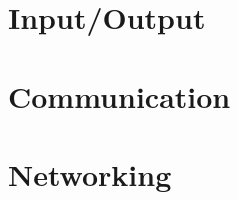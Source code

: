 \documentclass[a4paper]{exam}
\title{\papertitle}
\date{May 2018}
\begin{document}
\maketitle
\tableofcontents

\pagebreak
        

\pagebreak
        

\pagebreak
        

\pagebreak
        

\pagebreak


\pagebreak


\pagebreak


\pagebreak
\section{Input/Output}
\section{Communication}
\section{Networking}

\pagebreak

\end{document}
